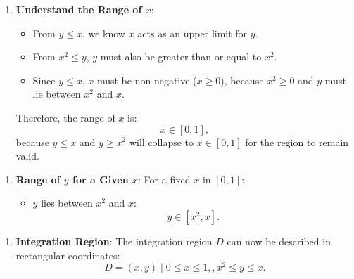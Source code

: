 \documentclass[a4paper,12pt]{book}
\begin{document}
\hrulefill
\begin{enumerate}
\item 
\textbf{Understand the Range of \(x\)}:
\begin{itemize}
\item 
From \(y \leq x\), we know \(x\) acts as an upper limit for \(y\).

\item 
From \(x^2 \leq y\), \(y\) must also be greater than or equal to \(x^2\).

\item 
Since \(y \leq x\), \(x\) must be non-negative (\(x \geq 0\)), because \(x^2 \geq 0\) and \(y\) must lie between \(x^2\) and \(x\).

\end{itemize}

Therefore, the range of \(x\) is:
\[
x \in [0, 1],
\]
because \(y \leq x\) and \(y \geq x^2\) will collapse to \(x \in [0, 1]\) for the region to remain valid.

\end{enumerate}

\hrulefill
\begin{enumerate}
\item 
\textbf{Range of \(y\) for a Given \(x\)}:
For a fixed \(x\) in \([0, 1]\):
\begin{itemize}
\item 
\(y\) lies between \(x^2\) and \(x\):
\[
y \in [x^2, x].
\]

\end{itemize}

\end{enumerate}

\hrulefill
\begin{enumerate}
\item 
\textbf{Integration Region}:
The integration region \(D\) can now be described in rectangular coordinates:
\[
D = { (x, y) \mid 0 \leq x \leq 1, , x^2 \leq y \leq x }.
\]

\end{enumerate}

\hrulefill
\end{document}
